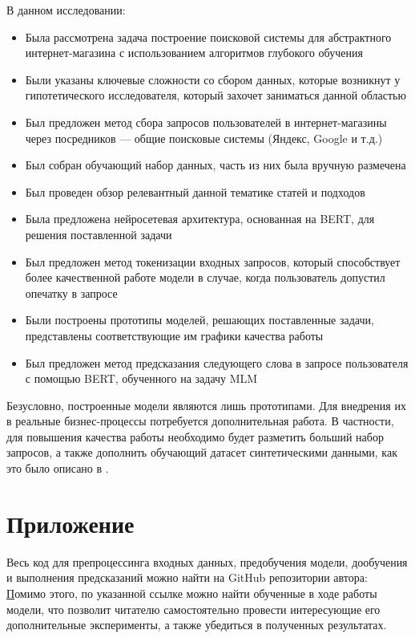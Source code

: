 \documentclass[12pt,a4paper]{article}
\begin{document}
В данном исследовании:
\begin{itemize}
    \item Была рассмотрена задача построение поисковой системы для абстрактного интернет-магазина с использованием алгоритмов глубокого обучения
    \item Были указаны ключевые сложности со сбором данных, которые возникнут у гипотетического исследователя, который захочет заниматься данной областью 
    \item Был предложен метод сбора запросов пользователей в интернет-магазины через посредников --- общие поисковые системы (Яндекс, Google и т.д.)
    \item Был собран обучающий набор данных, часть из них была вручную размечена
    \item Был проведен обзор релевантный данной тематике статей и подходов
    \item Была предложена нейросетевая архитектура, основанная на BERT, для решения поставленной задачи
    \item Был предложен метод токенизации входных запросов, который способствует более качественной работе модели в случае, когда пользователь допустил опечатку в запросе
    \item Были построены прототипы моделей, решающих поставленные задачи, представлены соответствующие им графики качества работы
    \item Был предложен метод предсказания следующего слова в запросе пользователя с помощью BERT, обученного на задачу MLM
\end{itemize}

Безусловно, построенные модели являются лишь прототипами. Для внедрения их в реальные бизнес-процессы потребуется дополнительная работа. В частности, для повышения качества работы необходимо будет разметить больший набор запросов, а также дополнить обучающий датасет синтетическими данными, как это было описано в \cite{ner}.

\section{Приложение}

Весь код для препроцессинга входных данных, предобучения модели, дообучения и выполнения предсказаний можно найти на GitHub репозитории автора: \href{https://github.com/Sorrow321/cmc\_seminar/}

Помимо этого, по указанной ссылке можно найти обученные в ходе работы модели, что позволит читателю самостоятельно провести интересующие его дополнительные эксперименты, а также убедиться в полученных результатах.

 

\end{document}
